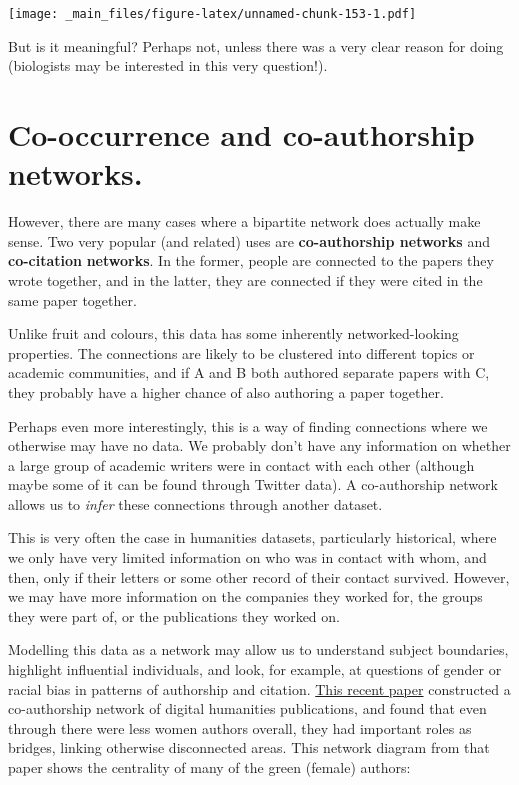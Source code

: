 \documentclass[
]{book}
\begin{document}
\texttt{[image: \_main\_files/figure-latex/unnamed-chunk-153-1.pdf]}

But is it meaningful? Perhaps not, unless there was a very clear reason for doing (biologists may be interested in this very question!).

\hypertarget{co-occurrence-and-co-authorship-networks.}{%
\section{Co-occurrence and co-authorship networks.}\label{co-occurrence-and-co-authorship-networks.}}

However, there are many cases where a bipartite network does actually make sense. Two very popular (and related) uses are \textbf{co-authorship networks} and \textbf{co-citation} \textbf{networks}. In the former, people are connected to the papers they wrote together, and in the latter, they are connected if they were cited in the same paper together.

Unlike fruit and colours, this data has some inherently networked-looking properties. The connections are likely to be clustered into different topics or academic communities, and if A and B both authored separate papers with C, they probably have a higher chance of also authoring a paper together.

Perhaps even more interestingly, this is a way of finding connections where we otherwise may have no data. We probably don't have any information on whether a large group of academic writers were in contact with each other (although maybe some of it can be found through Twitter data). A co-authorship network allows us to \emph{infer} these connections through another dataset.

This is very often the case in humanities datasets, particularly historical, where we only have very limited information on who was in contact with whom, and then, only if their letters or some other record of their contact survived. However, we may have more information on the companies they worked for, the groups they were part of, or the publications they worked on.

Modelling this data as a network may allow us to understand subject boundaries, highlight influential individuals, and look, for example, at questions of gender or racial bias in patterns of authorship and citation. \href{https://doi.org/10.1108/JD-11-2021-0221}{This recent paper} constructed a co-authorship network of digital humanities publications, and found that even through there were less women authors overall, they had important roles as bridges, linking otherwise disconnected areas. This network diagram from that paper shows the centrality of many of the green (female) authors:
\end{document}

